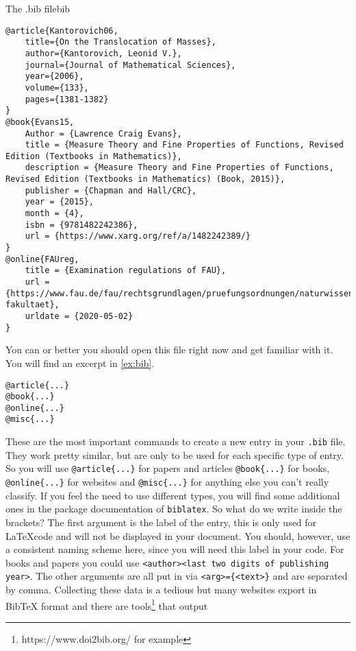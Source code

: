 \begin{example}{The .bib file}{bib}
\begin{lstlisting}
@article{Kantorovich06,
	title={On the Translocation of Masses},
	author={Kantorovich, Leonid V.},
	journal={Journal of Mathematical Sciences},
	year={2006},
	volume={133},
	pages={1381-1382}
}
@book{Evans15,
	Author = {Lawrence Craig Evans},
	title = {Measure Theory and Fine Properties of Functions, Revised Edition (Textbooks in Mathematics)},
	description = {Measure Theory and Fine Properties of Functions, Revised Edition (Textbooks in Mathematics) (Book, 2015)},
	publisher = {Chapman and Hall/CRC},
	year = {2015},
	month = {4},
	isbn = {9781482242386},
	url = {https://www.xarg.org/ref/a/1482242389/}
}
@online{FAUreg,
	title = {Examination regulations of FAU},
	url = {https://www.fau.de/fau/rechtsgrundlagen/pruefungsordnungen/naturwissenschaftliche-fakultaet},
	urldate = {2020-05-02}
}
\end{lstlisting}	
\end{example}
You can or better you should open this file right now and get familiar with it. 
You will find an excerpt in \cref{ex:bib}.
\begin{emphBox}
\lstinline|@article{...}|\\
\lstinline|@book{...}|\\
\lstinline|@online{...}|\\
\lstinline|@misc{...}|
\end{emphBox}
These are the most important commands to create a new entry in your \texttt{.bib} file. 
They work pretty similar, but are only to be used for each specific type of entry. 
So you will use \lstinline|@article{...}| for papers and articles \lstinline|@book{...}| 
for books, \lstinline|@online{...}| for websites and \lstinline|@misc{...}| for anything 
else you can't really classify. If you feel the need to use different types, you will 
find some additional ones in the package documentation of \texttt{biblatex}. 
So what do we write inside the brackets? 
The first argument is the label of the entry, this is only used for \LaTeX code and 
will not be displayed in your document. You should, however, use a consistent naming 
scheme here, since you will need this label in your code. For books and papers you 
could use \lstinline|<author><last two digits of publishing year>|. 
The other arguments are all put in via \lstinline|<arg>={<text>}| and are separated by 
comma. Collecting these data is a tedious but many websites export in BibTeX format 
and there are tools\footnote{https://www.doi2bib.org/ for example} that output 

